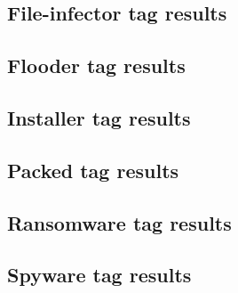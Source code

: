 \documentclass[pdfa%
,cucitura%
]{toptesi}
\begin{document}
\dropperTagRocProposedMethod

\subsection{File-infector tag results}
\fileInfectorTagResultsAtFprTable

\fileInfectorTagRocAloha

\fileInfectorTagRocJointEmbedding

\fileInfectorTagRocProposedMethod

\subsection{Flooder tag results}
\flooderTagResultsAtFprTable

\flooderTagRocAloha

\flooderTagRocJointEmbedding

\flooderTagRocProposedMethod

\subsection{Installer tag results}
\installerTagResultsAtFprTable

\installerTagRocAloha

\installerTagRocJointEmbedding

\installerTagRocProposedMethod

\subsection{Packed tag results}
\packedTagResultsAtFprTable

\packedTagRocAloha

\packedTagRocJointEmbedding

\packedTagRocProposedMethod

\subsection{Ransomware tag results}
\ransomwareTagResultsAtFprTable

\ransomwareTagRocAloha

\ransomwareTagRocJointEmbedding

\ransomwareTagRocProposedMethod

\subsection{Spyware tag results}
\spywareTagResultsAtFprTable
\end{document}

